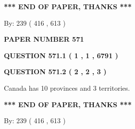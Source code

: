 \documentclass[12pt]{article}
\begin{document}
   
   
\vspace{1.0in} 
{\textbf{\large{ *** END OF PAPER, THANKS *** }}} 
   
   
\hspace{1.0in} By: 
 239 ( 416 ,  613 )
   
   
   
   
\newpage 
\setcounter{page}{ 
   571001 } 
   
   
   
   
 {\textbf{ \Large{ PAPER NUMBER  571  }}}
   
   
\vspace{0.2in}
   
   
   
   
   
   
 \vspace{0.2in}
 
 
 
 
   
   
  
\vspace{0.2in}
  
{\textbf{\Large{QUESTION
571.1 
 ( 1 , 1 , 6791 )
}}}
  
  
  
\vspace{0.2in}
  
{\textbf{\Large{QUESTION
571.2 
 ( 2 , 2 , 3 )
}}}
  
  
 
 
\noindent{}
 
 
Canada has 10  provinces and 3 territories.
 
 
 
 
   
   
 \vspace{0.2in}
 
   
   
   
   
\vspace{1.0in} 
{\textbf{\large{ *** END OF PAPER, THANKS *** }}} 
   
   
\hspace{1.0in} By: 
 239 ( 416 ,  613 )
   
   
   
   
\newpage 
\setcounter{page}{ 
   572001 } 
   
\end{document}
